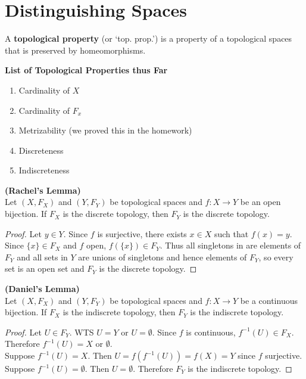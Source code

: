 

\chapter{Distinguishing Spaces} 
\begin{definition}
	A {\bf topological property} (or `top. prop.') is a property of a topological spaces that is preserved by homeomorphisms. 
\end{definition}
\begin{center}
	{\bf List of Topological Properties thus Far} 
\end{center}
\begin{enumerate}
	\item Cardinality of $X$ 
	\item Cardinality of $F_x$ 
	\item Metrizability (we proved this in the homework) 
	\item Discreteness 
	\item Indiscreteness 
\end{enumerate}
\begin{lemma}
	{\bf (Rachel's Lemma)}\\
	Let $(X, F_X) $ and $(Y, F_Y)$ be topological spaces and $f: X \rightarrow Y$ be an open bijection. If $F_X$ is the discrete topology, then $F_Y$ is the discrete topology. 
\end{lemma}
\begin{proof}
	Let $y \in Y$. Since $f$ is surjective, there exists $x \in X$ such that $f(x) = y$. Since $\{x\} \in F_X$ and $f$ open, $f(\{x\}) \in F_Y$. Thus all singletons in are elements of $F_Y$ and all sets in $Y$ are unions of singletons and hence elements of $F_Y$, so every set is an open set and $F_Y$ is the discrete topology. 
\end{proof}
\begin{lemma}
	{\bf (Daniel's Lemma)}\\
	Let $(X, F_X) $ and $(Y, F_Y)$ be topological spaces and $f: X \rightarrow Y$ be a continuous bijection. If $F_X$ is the indiscrete topology, then $F_Y$ is the indiscrete topology. 
\end{lemma}
\begin{proof}
	Let $U \in F_Y$. WTS $U = Y$ or $U = \emptyset$. Since $f$ is continuous, $f^{-1}(U) \in F_X$. Therefore $f^{-1}(U) = X$ or $\emptyset$. \\
	Suppose $f^{-1}(U) = X$. Then $U = f(f^{-1}(U)) = f(X) = Y$ since $f$ surjective.\\
	Suppose $f^{-1}(U) = \emptyset$. Then $U = \emptyset$. Therefore $F_Y$ is the indiscrete topology. 
\end{proof}

